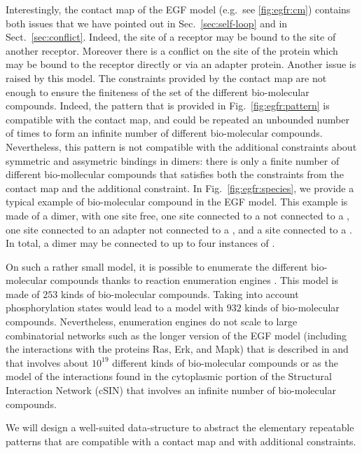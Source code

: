 \documentclass{entcs}
\begin{document}
Interestingly, the contact map of the EGF model (e.g.~see \ref{fig:egfr:cm})
contains both issues that we have pointed out in Sec.~\ref{sec:self-loop} and in Sect.~\ref{sec:conflict}. Indeed, the site  of a receptor may be bound to the site  of another receptor. Moreover there is a conflict on the site  of the protein  which may be bound to the receptor directly
or via an adapter protein. Another issue is raised by this model.
The constraints provided by the contact map are not enough to ensure the finiteness of the set of the different bio-molecular compounds. Indeed,
the pattern that is provided in Fig.~\ref{fig:egfr:pattern} is compatible with the contact map, and could be repeated an unbounded number of times to form an infinite number of different bio-molecular compounds. Nevertheless, this pattern is not compatible with the additional constraints about symmetric and assymetric bindings in dimers: there is only a finite number of different bio-mollecular compounds that satisfies both
the constraints from the contact map and the additional constraint.
In Fig.~\ref{fig:egfr:species}, we provide a typical example of bio-molecular compound in the EGF model. This example is made of a dimer, with one site  free, one site  connected to a  not connected to a , one site  connected to an adapter not connected to a , and a site  connected to a . In total, a dimer may be connected to up to four instances of .

On such a rather small model, it is possible to enumerate the different bio-molecular compounds thanks to reaction enumeration engines  \cite{BNGL,KaDe}. This model is made of $253$ kinds of bio-molecular compounds.
Taking into account phosphorylation states would lead to a model
with $932$ kinds of bio-molecular compounds. Nevertheless, enumeration engines do not scale to large combinatorial networks such as the longer version of the EGF model (including the interactions with the proteins Ras, Erk, and Mapk) that is described in \cite{DanosEtAl-CONCUR07} and that involves about $10^{19}$ different kinds of bio-molecular compounds \cite{DanosEtAl-VMCAI08} or as the model of the interactions found in the cytoplasmic portion of the Structural Interaction Network (cSIN) \cite{Deeds-et-al-plosone2012,Kim} that involves an infinite number of bio-molecular compounds.

We will design a well-suited data-structure to abstract the elementary repeatable patterns that are compatible with a contact map and with additional constraints.
\end{document}
